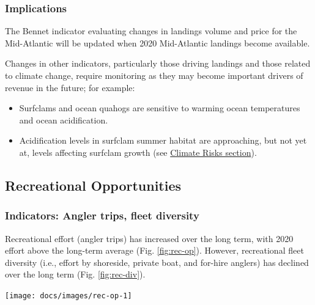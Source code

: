 \documentclass[
  10pt,
]{article}
\providecommand{\tightlist}{%
  \setlength{\itemsep}{0pt}\setlength{\parskip}{0pt}}
\let\origfigure\figure
\let\endorigfigure\endfigure
\renewenvironment{figure}[1][2] {
    \expandafter\origfigure\expandafter[H]
} {
    \endorigfigure
}
\begin{document}
\hypertarget{implications-1}{%
\subsubsection{Implications}\label{implications-1}}

The Bennet indicator evaluating changes in landings volume and price for
the Mid-Atlantic will be updated when 2020 Mid-Atlantic landings become
available.

Changes in other indicators, particularly those driving landings and
those related to climate change, require monitoring as they may become
important drivers of revenue in the future; for example:

\begin{itemize}
\tightlist
\item
  Surfclams and ocean quahogs are sensitive to warming ocean
  temperatures and ocean acidification.\\
\item
  Acidification levels in surfclam summer habitat are approaching, but
  not yet at, levels affecting surfclam growth (see
  \protect\hyperlink{climate-and-ecosystem-productivity}{Climate Risks
  section}).
\end{itemize}

\hypertarget{recreational-opportunities}{%
\subsection{Recreational
Opportunities}\label{recreational-opportunities}}

\hypertarget{indicators-angler-trips-fleet-diversity}{%
\subsubsection{Indicators: Angler trips, fleet
diversity}\label{indicators-angler-trips-fleet-diversity}}

Recreational effort (angler trips) has increased over the long term,
with 2020 effort above the long-term average (Fig. \ref{fig:rec-op}).
However, recreational fleet diversity (i.e., effort by shoreside,
private boat, and for-hire anglers) has declined over the long term
(Fig. \ref{fig:rec-div}).

\begin{figure}

{\centering \texttt{[image: docs/images/rec-op-1]} 

}

\caption{Recreational effort in the Mid-Atlantic.}\label{fig:rec-op}
\end{figure}
\end{document}
